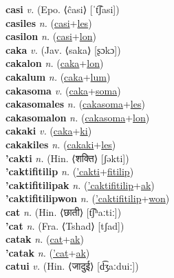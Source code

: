 \textbf{casi} \textit{v.} (Epo. ⟨ĉasi⟩ [ˈt͡ʃasi])
 \label{casi} \\
\textbf{casiles} \textit{n.} (\hyperref[casi]{casi}+\hyperref[les]{les})
 \label{casiles} \\
\textbf{casilon} \textit{n.} (\hyperref[casi]{casi}+\hyperref[lon]{lon})
 \label{casilon} \\
\textbf{caka} \textit{v.} (Jav. ⟨saka⟩ [ʂɔkɔ])
 \label{caka} \\
\textbf{cakalon} \textit{n.} (\hyperref[caka]{caka}+\hyperref[lon]{lon})
 \label{cakalon} \\
\textbf{cakalum} \textit{n.} (\hyperref[caka]{caka}+\hyperref[lum]{lum})
 \label{cakalum} \\
\textbf{cakasoma} \textit{v.} (\hyperref[caka]{caka}+\hyperref[soma]{soma})
 \label{cakasoma} \\
\textbf{cakasomales} \textit{n.} (\hyperref[cakasoma]{cakasoma}+\hyperref[les]{les})
 \label{cakasomales} \\
\textbf{cakasomalon} \textit{n.} (\hyperref[cakasoma]{cakasoma}+\hyperref[lon]{lon})
 \label{cakasomalon} \\
\textbf{cakaki} \textit{v.} (\hyperref[caka]{caka}+\hyperref[ki]{ki})
 \label{cakaki} \\
\textbf{cakakiles} \textit{n.} (\hyperref[cakaki]{cakaki}+\hyperref[les]{les})
 \label{cakakiles} \\
\textbf{'cakti} \textit{n.} (Hin. ⟨शक्ति⟩ [ʃəkti])
 \label{'cakti} \\
\textbf{'caktifitilip} \textit{n.} (\hyperref['cakti]{'cakti}+\hyperref[fitilip]{fitilip})
 \label{'caktifitilip} \\
\textbf{'caktifitilipak} \textit{n.} (\hyperref['caktifitilip]{'caktifitilip}+\hyperref[ak]{ak})
 \label{'caktifitilipak} \\
\textbf{'caktifitilipwon} \textit{n.} (\hyperref['caktifitilip]{'caktifitilip}+\hyperref[won]{won})
 \label{'caktifitilipwon} \\
\textbf{cat} \textit{n.} (Hin. ⟨छाती⟩ [t͡ʃʰaːtiː])
 \label{cat} \\
\textbf{'cat} \textit{n.} (Fra. ⟨Tshad⟩ [tʃad])
 \label{'cat} \\
\textbf{catak} \textit{n.} (\hyperref[cat]{cat}+\hyperref[ak]{ak})
 \label{catak} \\
\textbf{'catak} \textit{n.} (\hyperref['cat]{'cat}+\hyperref[ak]{ak})
 \label{'catak} \\
\textbf{catui} \textit{v.} (Hin. ⟨जादुई⟩ [d͡ʒaːduiː])
 \label{catui} \\

